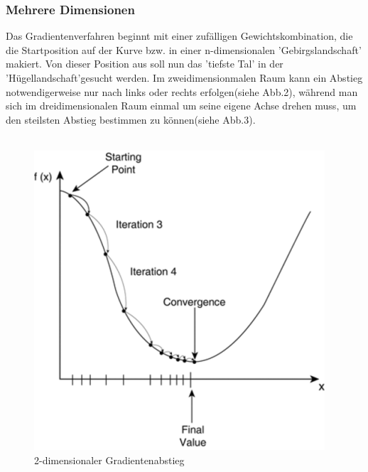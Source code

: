 \subsubsection{Mehrere Dimensionen}\label{subsec:gradientenverfahren:mehrere_dimensionen}
 Das Gradientenverfahren beginnt mit einer zufälligen Gewichtskombination, die die Startposition auf der Kurve bzw. in einer n-dimensionalen 'Gebirgslandschaft' makiert.
  Von dieser Position aus soll nun das 'tiefste Tal' in der 'Hügellandschaft'gesucht werden.
  Im zweidimensionmalen Raum kann ein Abstieg notwendigerweise nur nach links oder rechts erfolgen(siehe Abb.2), während man sich im dreidimensionalen Raum einmal um seine eigene Achse drehen muss,
  um den steilsten Abstieg bestimmen zu können(siehe Abb.3).
  \\
  \\
  \begin{figure}[ht]
    \centering
    \begin{minipage}{0.45\textwidth}
        \centering
        \includegraphics[width=\textwidth]{Sources/03-01_2_dimensionale_grafik_gd.png}
        \caption{2-dimensionaler Gradientenabstieg}
        \label{subsec:2-dimensionaler Gradientenabstieg}
    \end{minipage}\hfill

\end{figure}
